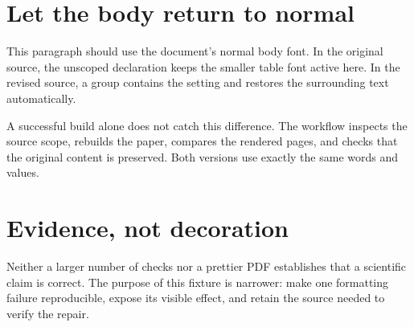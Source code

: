 \section{Let the body return to normal}
This paragraph should use the document's normal body font. In the original source, the unscoped declaration keeps the smaller table font active here. In the revised source, a group contains the setting and restores the surrounding text automatically.

A successful build alone does not catch this difference. The workflow inspects the source scope, rebuilds the paper, compares the rendered pages, and checks that the original content is preserved. Both versions use exactly the same words and values.
\section{Evidence, not decoration}
Neither a larger number of checks nor a prettier PDF establishes that a scientific claim is correct. The purpose of this fixture is narrower: make one formatting failure reproducible, expose its visible effect, and retain the source needed to verify the repair.
